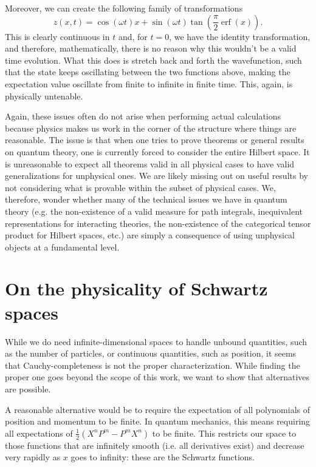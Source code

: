 \documentclass[10pt,twocolumn, nofootinbib]{revtex4-2}
\DeclareMathOperator{\erf}{erf}
\begin{document}
Moreover, we can create the following family of transformations
\begin{equation}
z(x, t) = \cos(\omega t) x + \sin(\omega t) \tan \left(\frac{\pi}{2}\erf(x)\right).
\end{equation}
This is clearly continuous in $t$ and, for $t=0$, we have the identity transformation, and therefore, mathematically, there is no reason why this wouldn't be a valid time evolution. What this does is stretch back and forth the wavefunction, such that the state keeps oscillating between the two functions above, making the expectation value oscillate from finite to infinite in finite time. This, again, is physically untenable.

Again, these issues often do not arise when performing actual calculations because physics makes us work in the corner of the structure where things are reasonable. The issue is that when one tries to prove theorems or general results on quantum theory, one is currently forced to consider the entire Hilbert space. It is unreasonable to expect all theorems valid in all physical cases to have valid generalizations for unphysical ones. We are likely missing out on useful results by not considering what is provable within the subset of physical cases. We, therefore, wonder whether many of the technical issues we have in quantum theory (e.g. the non-existence of a valid measure for path integrals\cite{glimm_quantum_1987}, inequivalent representations for interacting theories\cite{earman_haags_2006}, the non-existence of the categorical tensor product for Hilbert spaces\cite{garrett_tensor_2010, sorkin_inside_2022}, etc.)  are simply a consequence of using unphysical objects at a fundamental level.

\section{On the physicality of Schwartz spaces}

While we do need infinite-dimensional spaces to handle unbound quantities, such as the number of particles, or continuous quantities, such as position, it seems that Cauchy-completeness is not the proper characterization. While finding the proper one goes beyond the scope of this work, we want to show that alternatives are possible.

A reasonable alternative would be to require the expectation of all polynomials of position and momentum to be finite. In quantum mechanics, this means requiring all expectations of $\frac{1}{2}(X^nP^m - P^mX^n)$ to be finite. This restricts our space to those functions that are infinitely smooth (i.e. all derivatives exist) and decrease very rapidly as $x$ goes to infinity: these are the Schwartz functions.
\end{document}
